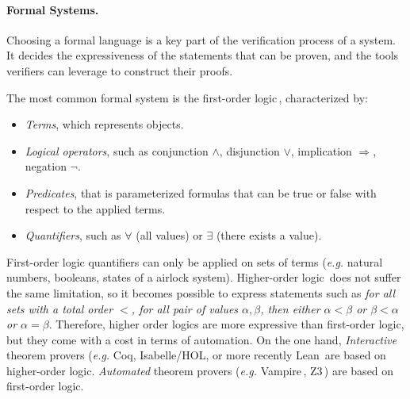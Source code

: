 \paragraph{Formal Systems.}
%
Choosing a formal language is a key part of the verification process of a
system.
%
It decides the expressiveness of the statements that can be proven, and the
tools verifiers can leverage to construct their proofs.

The most common formal system is the first-order logic\,\cite{smullyan2012fol},
characterized by:
%
\begin{itemize}
\item \emph{Terms}, which represents objects.
\item \emph{Logical operators}, such as conjunction \( \wedge \), disjunction
  \( \vee \), implication \( \Rightarrow \), negation \( \neg \).
\item \emph{Predicates}, that is parameterized formulas that can be true or
  false with respect to the applied terms.
\item \emph{Quantifiers}, such as \( \forall \) (all values) or \( \exists \)
  (there exists a value).
\end{itemize}

First-order logic quantifiers can only be applied on sets of terms (\emph{e.g.}
natural numbers, booleans, states of a airlock system).
%
Higher-order logic\,\cite{leivant1994hol} does not suffer the same limitation,
so it becomes possible to express statements such as \emph{for all sets with a
  total order \( < \), for all pair of values \( \alpha, \beta \), then either
  \( \alpha < \beta \) or \( \beta < \alpha \) or \( \alpha = \beta \)}.
%
Therefore, higher order logics are more expressive than first-order logic, but
they come with a cost in terms of automation.
%
On the one hand, \emph{Interactive} theorem provers (\emph{e.g.}  Coq,
Isabelle/HOL, or more recently Lean\,\cite{de2015lean} are based on higher-order
logic.
%
\emph{Automated} theorem provers (\emph{e.g.}
Vampire\,\cite{riazanov2002vampire}, Z3\,\cite{de2008z3}) are based on
first-order logic.

